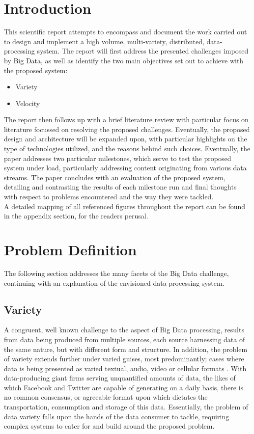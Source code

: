 \documentclass[10pt,conference]{IEEEtran}
\begin{document}
\section{Introduction}
This scientific report attempts to encompass and document the work carried out to design and implement a high volume, multi-variety, distributed, data-processing system. The report will first address the presented challenges imposed by Big Data, as well as identify the two main objectives set out to achieve with the proposed system:
\begin{itemize}
    \item Variety
    \item Velocity
\end{itemize}
The report then follows up with a brief literature review with particular focus on literature focussed on resolving the proposed challenges. Eventually, the proposed design and architecture will be expanded upon, with particular highlights on the type of technologies utilized, and the reasons behind such choices. Eventually, the paper addresses two particular milestones, which serve to test the proposed system under load, particularly addressing content originating from various data streams. The paper concludes with an evaluation of the proposed system, detailing and contrasting the results of each milestone run and final thoughts with respect to problems encountered and the way they were tackled.
\\
A detailed mapping of all referenced figures throughout the report can be found in the appendix section, for the readers perusal.

\section{Problem Definition}
The following section addresses the many facets of the Big Data challenge, continuing with an explanation of the envisioned data processing system.

\subsection{Variety}
A congruent, well known challenge to the aspect of Big Data processing, results from data being produced from multiple sources, each source harnessing data of the same nature, but with different form and structure. In addition, the problem of variety extends further under varied guises, most predominantly; cases where data is being presented as varied textual, audio, video or cellular formats \cite{MgmtRevolution}. With data-producing giant firms serving unquantified amounts of data, the likes of which Facebook and Twitter are capable of generating on a daily basis, there is no common consensus, or agreeable format upon which dictates the transportation, consumption and storage of this data. Essentially, the problem of data variety falls upon the hands of the data consumer to tackle, requiring complex systems to cater for and build around the proposed problem. 
\end{document}
